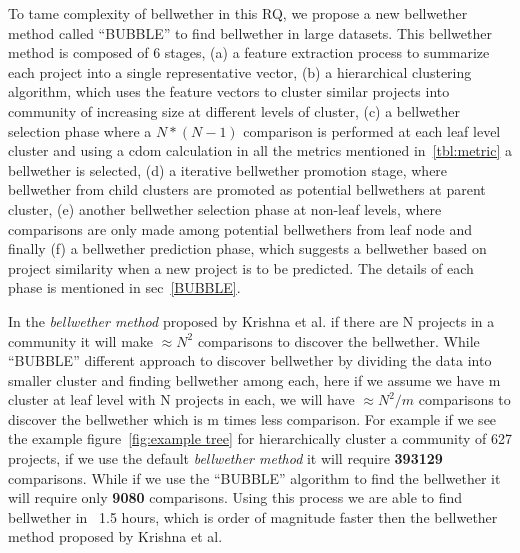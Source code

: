 \documentclass[sigconf,review]{acmart}
\theoremstyle{break}
\begin{document}
To tame complexity of bellwether in this RQ, we propose a new bellwether method called ``BUBBLE'' to find bellwether in large datasets. This bellwether method is composed of 6 stages, (a) a feature extraction process to summarize each project into a single representative vector, (b) a hierarchical clustering algorithm, which uses the feature vectors to cluster similar projects into community of increasing size at different levels of cluster, (c) a bellwether selection phase where a $N*(N-1)$ comparison is performed at each leaf level cluster and using a cdom calculation in all the metrics mentioned in~\ref{tbl:metric} a bellwether is selected, (d) a iterative bellwether promotion stage, where bellwether from child clusters are promoted as potential bellwethers at parent cluster, (e) another bellwether selection phase at non-leaf levels, where comparisons are only made among potential bellwethers from leaf node and finally (f) a bellwether prediction phase, which suggests a bellwether based on project similarity when a new project is to be predicted. The details of each phase is mentioned in sec~\ref{BUBBLE}. 

In the \textit{bellwether method} proposed by Krishna et al. if there are N projects in a community it will make $\approx N^2$ comparisons to discover the bellwether. While ``BUBBLE'' different approach to discover bellwether by dividing the data into smaller cluster and finding bellwether among each, here if we assume we have m cluster at leaf level with N projects in each, we will have 
$\approx N^2/m$ comparisons to discover the bellwether which is m times less comparison. For example if we see the example figure~\ref{fig:example tree} for hierarchically cluster a community of 627 projects, if we use the default \textit{bellwether method} it will require \textbf{393129} comparisons. While if we use the ``BUBBLE'' algorithm to find the bellwether it will require only \textbf{9080} comparisons. Using this process we are able to find bellwether in ~1.5 hours, which is order of magnitude faster then the bellwether method proposed by Krishna et al. 
\end{document}
